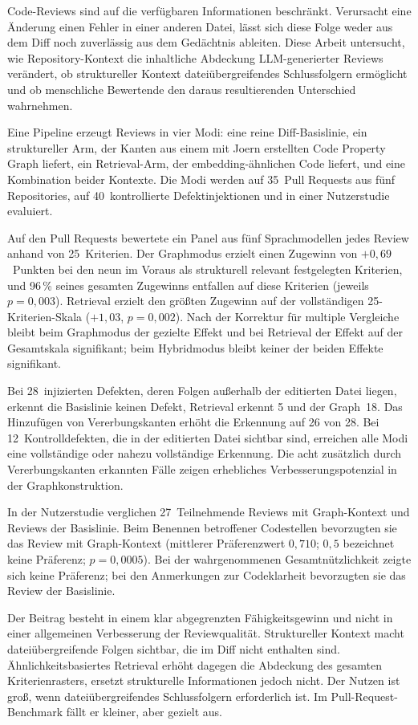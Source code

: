 
Code-Reviews sind auf die verfügbaren Informationen beschränkt. Verursacht
eine Änderung einen Fehler in einer anderen Datei, lässt sich diese Folge weder
aus dem Diff noch zuverlässig aus dem Gedächtnis ableiten. Diese Arbeit
untersucht, wie Repository-Kontext die inhaltliche Abdeckung LLM-generierter
Reviews verändert, ob struktureller Kontext dateiübergreifendes Schlussfolgern
ermöglicht und ob menschliche Bewertende den daraus resultierenden
Unterschied wahrnehmen.

Eine Pipeline erzeugt Reviews in vier Modi: eine reine Diff-Basislinie, ein
struktureller Arm, der Kanten aus einem mit Joern erstellten Code Property Graph
liefert, ein Retrieval-Arm, der embedding-ähnlichen Code liefert, und eine
Kombination beider Kontexte. Die Modi werden auf 35~Pull Requests aus fünf
Repositories, auf 40~kontrollierte Defektinjektionen und in einer
Nutzerstudie evaluiert.

Auf den Pull Requests bewertete ein Panel aus fünf Sprachmodellen jedes Review
anhand von 25~Kriterien. Der Graphmodus erzielt einen Zugewinn von
$+0{,}69$~Punkten bei den neun im Voraus als strukturell relevant festgelegten
Kriterien, und 96\,\% seines gesamten Zugewinns entfallen auf diese
Kriterien (jeweils $p = 0{,}003$). Retrieval erzielt den größten Zugewinn auf der
vollständigen 25-Kriterien-Skala ($+1{,}03$, $p = 0{,}002$). Nach der Korrektur
für multiple Vergleiche bleibt beim Graphmodus der gezielte Effekt und bei
Retrieval der Effekt auf der Gesamtskala signifikant; beim Hybridmodus bleibt
keiner der beiden Effekte signifikant.

Bei 28~injizierten Defekten, deren Folgen außerhalb der editierten Datei
liegen, erkennt die Basislinie keinen Defekt, Retrieval erkennt 5 und der
Graph~18. Das Hinzufügen von Vererbungskanten erhöht die Erkennung auf 26 von
28. Bei
12~Kontrolldefekten, die in der editierten Datei sichtbar sind, erreichen alle
Modi eine vollständige oder nahezu vollständige Erkennung. Die acht zusätzlich
durch Vererbungskanten erkannten Fälle zeigen erhebliches Verbesserungspotenzial
in der Graphkonstruktion.

In der Nutzerstudie verglichen 27~Teilnehmende Reviews mit Graph-Kontext
und Reviews der Basislinie. Beim Benennen betroffener Codestellen
bevorzugten sie das Review mit Graph-Kontext (mittlerer Präferenzwert
$0{,}710$; $0{,}5$ bezeichnet keine Präferenz; $p = 0{,}0005$). Bei der
wahrgenommenen Gesamtnützlichkeit zeigte sich keine Präferenz; bei den
Anmerkungen zur Codeklarheit bevorzugten sie das Review der Basislinie.

Der Beitrag besteht in einem klar abgegrenzten Fähigkeitsgewinn und nicht in
einer allgemeinen Verbesserung der Reviewqualität. Struktureller Kontext macht
dateiübergreifende Folgen sichtbar, die im Diff nicht enthalten sind.
Ähnlichkeitsbasiertes Retrieval erhöht dagegen die Abdeckung des gesamten
Kriterienrasters, ersetzt strukturelle Informationen jedoch nicht. Der Nutzen
ist groß, wenn dateiübergreifendes Schlussfolgern erforderlich ist. Im
Pull-Request-Benchmark fällt er kleiner, aber gezielt aus.

